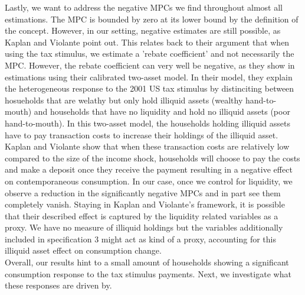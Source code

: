 Lastly, we want to address the negative MPCs we find throughout almost all estimations. The MPC is bounded by zero at its lower bound by the definition of the concept. However, in our setting, negative estimates are still possible, as Kaplan and Violante point out. This relates back to their argument that when using the tax stimulus, we estimate a 'rebate coefficient' and not necessarily the MPC. However, the rebate coefficient can very well be negative, as they show in estimations using their calibrated two-asset model. In their model, they explain the heterogeneous response to the 2001 US tax stimulus by distinciting between hosueholds that are welathy but only hold illiquid assets (wealthy hand-to-mouth) and households that have no liquidity and hold no illiquid assets (poor hand-to-mouth). In this two-asset model, the households holding illiquid assets have to pay transaction costs to increase their holdings of the illiquid asset. Kaplan and Violante show that when these transaction costs are relatively low compared to the size of the income shock, households will choose to pay the costs and make a deposit once they receive the payment resulting in a negative effect on contemporaneous consumption. In our case, once we control for liquidity, we observe a reduction in the significantly negative MPCs and in part see them completely vanish. Staying in Kaplan and Violante's framework, it is possible that their described effect is captured by the liquidity related variables as a proxy. We have no measure of illiquid holdings but the variables additionally included in specification 3 might act as kind of a proxy, accounting for this illiquid asset effect on consumption change. \\
Overall, our results hint to a small amount of households showing a significant consumption response to the tax stimulus payments. Next, we investigate what these responses are driven by.
